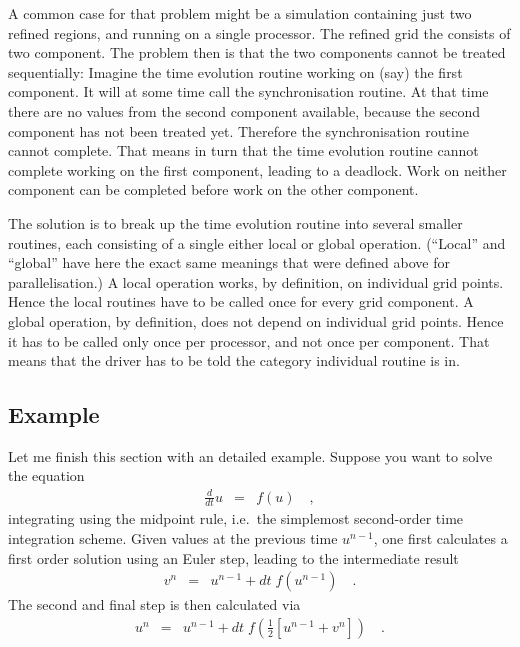 A common case for that problem might be a simulation containing just
two refined regions, and running on a single processor.  The refined
grid the consists of two component.  The problem then is that the two
components cannot be treated sequentially: Imagine the time evolution
routine working on (say) the first component.  It will at some time
call the synchronisation routine.  At that time there are no values
from the second component available, because the second component has
not been treated yet.  Therefore the synchronisation routine cannot
complete.  That means in turn that the time evolution routine cannot
complete working on the first component, leading to a deadlock.  Work
on neither component can be completed before work on the other
component.

The solution is to break up the time evolution routine into several
smaller routines, each consisting of a single either local or global
operation.  (``Local'' and ``global'' have here the exact same
meanings that were defined above for parallelisation.)  A local
operation works, by definition, on individual grid points.  Hence the
local routines have to be called once for every grid component.  A
global operation, by definition, does not depend on individual grid
points.  Hence it has to be called only once per processor, and not
once per component.  That means that the driver has to be told the
category individual routine is in.

\subsection{Example}

Let me finish this section with an detailed example.  Suppose you want
to solve the equation
\begin{eqnarray}
   \frac{d}{dt} u & = & f(u) \quad ,
\end{eqnarray}
integrating using the midpoint rule, i.e.\ the simplemost second-order
time integration scheme.  Given values at the previous time $u^{n-1}$,
one first calculates a first order solution using an Euler step,
leading to the intermediate result
\begin{eqnarray}
   v^n & = & u^{n-1} + dt\; f(u^{n-1}) \quad .
\end{eqnarray}
The second and final step is then calculated via
\begin{eqnarray}  
   u^n & = & u^{n-1} + dt\; f(\frac{1}{2} [u^{n-1} + v^n]) \quad .
\end{eqnarray}

